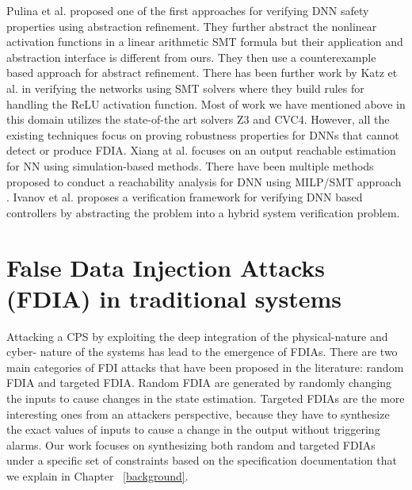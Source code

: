 Pulina et al.\cite{10.1007/978-3-642-14295-6_24} proposed one of the first approaches for verifying DNN safety properties using abstraction refinement. They further abstract \cite{article} the nonlinear activation functions in a linear arithmetic \ac{SMT} formula but their application and abstraction interface is different from ours. 
They then use a counterexample based approach for abstract refinement. There has been further work by Katz et al.\cite{10.1007/978-3-319-63387-9_5} in verifying the networks using SMT solvers where they build rules for handling the ReLU activation function. Most of work we have mentioned above in this domain utilizes the state-of-the art solvers Z3 and CVC4. However, all the existing techniques focus on proving robustness properties \cite{NIPS2016_6339} for DNNs that cannot detect or produce FDIA. Xiang at al.\cite{xiang2017output} focuses on an output reachable estimation for NN using simulation-based methods. There have been multiple methods proposed to conduct a reachability analysis for DNN using MILP/SMT approach \cite{10.1145/3302504.3313351} \cite{ehlers2017formal} \cite{10.1007/978-3-319-63387-9_5} \cite{lomuscio2017approach} \cite{article}. Ivanov et al. \cite{ivanov2018verisig} proposes a verification framework for verifying DNN based controllers by abstracting the problem into a hybrid system verification problem.  


\section{False Data Injection Attacks (FDIA) in traditional systems}
Attacking a CPS by exploiting the deep integration of the physical-nature and cyber- nature of the systems has lead to the emergence of FDIAs. 
There are two main categories of FDI attacks that have been proposed in the literature: random FDIA and targeted FDIA. Random FDIA are generated by randomly changing the inputs to cause changes in the state estimation. Targeted FDIAs are the more interesting ones from an attackers perspective, because they have to synthesize the exact values of inputs to cause a change in the output without triggering alarms. Our work focuses on synthesizing both random and targeted FDIAs under a specific set of constraints based on the specification documentation that we explain in Chapter ~\ref{background}. 

